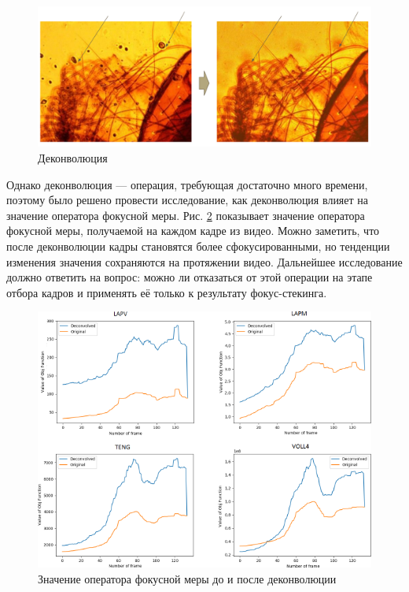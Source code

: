 \documentclass[14pt]{matmex-diploma-custom}
\begin{document}
\begin{figure}[h]
    \centering
    \includegraphics[width=.95\textwidth]{figures/deconvolution1.png}
    \caption{Деконволюция}
    \label{deconvolution1}
\end{figure}

\newpage
Однако деконволюция --- операция, требующая достаточно много времени, поэтому было решено провести исследование, как деконволюция влияет на значение оператора фокусной меры. Рис. \ref{deconvolution2} показывает значение оператора фокусной меры, получаемой на каждом кадре из видео. Можно заметить, что после деконволюции кадры становятся более сфокусированными, но тенденции изменения значения сохраняются на протяжении видео. Дальнейшее исследование должно ответить на вопрос: можно ли отказаться от этой операции на этапе отбора кадров и применять её  только к результату фокус-стекинга.

\begin{figure}[h]
    \centering
    \includegraphics[width=1.0\textwidth]{figures/deconvolution2.png}
    \caption{Значение оператора фокусной меры до и после деконволюции}
    \label{deconvolution2}
\end{figure}
\end{document}
